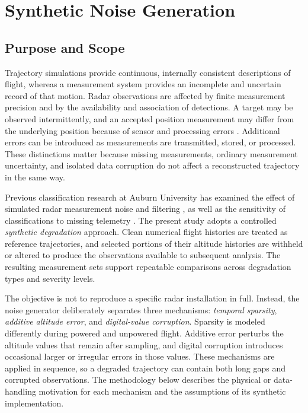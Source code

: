 \chapter{Synthetic Noise Generation}
\label{ch:synthetic-noise}

\section{Purpose and Scope}
\label{sec:noise-purpose}

Trajectory simulations provide continuous, internally consistent descriptions of
flight, whereas a measurement system provides an incomplete and uncertain
record of that motion. Radar observations are affected by finite measurement
precision and by the availability and association of detections. A target may be
observed intermittently, and an accepted position measurement may differ from
the underlying position because of sensor and processing errors
\cite{barshalom1975clutter,barshalom2001estimation}. Additional errors can be
introduced as measurements are transmitted, stored, or processed. These
distinctions matter because missing measurements, ordinary measurement
uncertainty, and isolated data corruption do not affect a reconstructed
trajectory in the same way.

Previous classification research at Auburn University has examined the effect
of simulated radar measurement noise and filtering
\cite{eckert2020thesis}, as well as the sensitivity of classifications to
missing telemetry \cite{cervantes2024telemetry}. The present study adopts a
controlled \emph{synthetic degradation} approach. Clean numerical flight
histories are treated as reference trajectories, and selected portions of
their altitude histories are withheld or altered to produce the observations
available to subsequent analysis. The resulting measurement sets support
repeatable comparisons across degradation types and severity levels.

The objective is not to reproduce a specific radar installation in full.
Instead, the noise generator deliberately separates three mechanisms:
\emph{temporal sparsity}, \emph{additive altitude error}, and
\emph{digital-value corruption}. Sparsity is modeled differently during
powered and unpowered flight. Additive error perturbs the altitude values
that remain after sampling, and digital corruption introduces occasional
larger or irregular errors in those values. These mechanisms are applied
in sequence, so a degraded trajectory can contain both long gaps and
corrupted observations. The methodology below describes the physical or
data-handling motivation for each mechanism and the assumptions of its
synthetic implementation.


